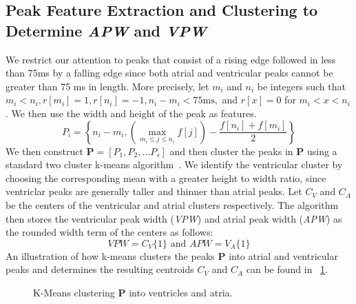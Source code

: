 \documentclass[conference]{IEEEtran}
\newcommand{\APW}{\textit{APW}}
\newcommand{\VPW}{\textit{VPW}}
\begin{document}
\subsection{Peak Feature Extraction and Clustering to Determine \APW{} and \VPW}
We restrict our attention to peaks that consist of a rising edge
followed in less than 75ms by a falling edge since 
both atrial and ventricular peaks cannot be greater than 75 ms in length.
More precisely, let $m_i$ and $n_i$ be integers such that $m_i < n_i, r[m_i]=1, r[n_i] = -1, n_i-m_i < 75 \text{ms},$ and $r[x]=0 $ for $m_i < x < n_i$.
We then use the width and height of the peak as features.
\begin{equation*}
	P_i = \left\{n_i-m_i, \left( \max\limits_{m_i\le j\le n_i} f[j] \right) - \frac{f[n_i]+f[m_i]}{2} \right\}
\end{equation*}
 We then construct $\mathbf{P} = [P_1, P_2, \dots P_s]$ and then
cluster the peaks in $\mathbf{P}$ using a standard two cluster k-means
algorithm~\cite{k-means}. 
We identify the ventricular cluster by choosing the corresponding mean 
with a greater height to width ratio, since
ventriclar peaks are generally taller and thinner than atrial peaks. Let $C_V$ and $C_A$
be the centers of the ventricular and atrial clusters %
respectively. The algorithm then stores the ventricular
peak width (\VPW) and atrial peak width (\APW) as the
rounded width term of the centers as follows:
\begin{equation*}
	VPW=C_V\{1\} \text{ and } APW=V_A\{1\}
\end{equation*}
An illustration of how k-means clusters the
peaks $\mathbf{P}$ into atrial and ventricular peaks and
determines the resulting centroids $C_V$ and $C_A$ can be
found in  \figurename~\ref{fig:kmeans}.


\begin{figure}
	\centering
	\caption{
	K-Means clustering $\mathbf{P}$ into ventricles and atria.}
		\label{fig:kmeans}
\end{figure}
\end{document}

